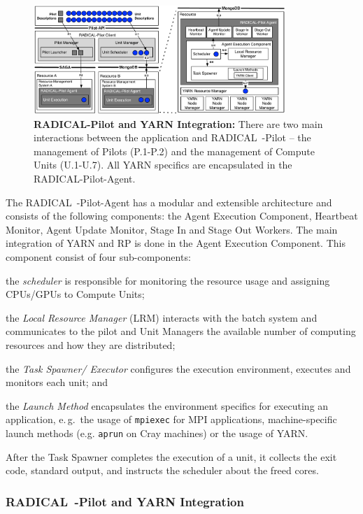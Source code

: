 \begin{figure}
    \centering
    \includegraphics[width=0.85\textwidth]{figures/data_analytics_hpc/hpc_hadoop/rp-architecture-yarn.pdf}
    \caption{\textbf{RADICAL-Pilot and YARN Integration:} There are two main interactions between the application and RADICAL~-Pilot -- the management of Pilots (P.1-P.2) and the management of Compute Units (U.1-U.7).  All YARN specifics are encapsulated in the RADICAL-Pilot-Agent.\label{fig:comp_rp_arch}}
\end{figure}

The RADICAL~-Pilot-Agent has a modular and extensible architecture and consists of the following components: the Agent Execution Component, Heartbeat Monitor, Agent Update Monitor, Stage In and Stage Out Workers.
The main integration of YARN and RP is done in the Agent Execution Component.
This component consist of four sub-components:
\begin{inparaenum}[a)]
    \item the \textit{scheduler} is responsible for monitoring the resource usage and assigning CPUs/GPUs to Compute Units;
    \item the \textit{Local Resource Manager} (LRM) interacts with the batch system and communicates to the pilot and Unit Managers the available number of computing resources and how they are distributed;
    \item the \textit{Task Spawner/ Executor} configures the execution environment, executes and monitors each unit; and
    \item the \textit{Launch Method} encapsulates the environment specifics for executing an application, e.\,g.\ the usage of \texttt{mpiexec} for MPI applications, machine-specific launch methods (e.g. \texttt{aprun} on Cray machines) or the usage of YARN.
\end{inparaenum}
After the Task Spawner completes the execution of a unit, it collects the exit code, standard output, and instructs the scheduler about the freed cores.

\subsubsection*{RADICAL~-Pilot and YARN Integration}
\label{sssec:rp-yarn}

